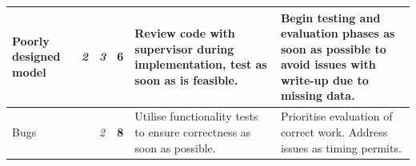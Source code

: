 \documentclass[12pt,a4,xcolor=table]{article}
\begin{document}
\begin{table}[h!]
\begin{tabular}{|>{\centering}m{1.5in} |>{\centering}m{0.1in} |>{\centering}m{0.1in} |>{\centering}m{0.3in} |>{\centering}m{1.8in} |>{\centering\arraybackslash}m{1.8in}|}
			Poorly designed model                                          & \cellcolor[HTML]{F8FF00}\textit{2}                        & \cellcolor[HTML]{FFC702}\textit{3}                        & \cellcolor[HTML]{FFC702}\textbf{6}  & Review code with supervisor during implementation, test as soon as is feasible.                                      & Begin testing and evaluation phases as soon as possible to avoid issues with write-up due to missing data.    \\ \hline
			Bugs                                                           & \cellcolor[HTML]{F88602}{\color[HTML]{333333} \textit{4}} & \cellcolor[HTML]{F8FF00}\textit{2}                        & \cellcolor[HTML]{FFC702}\textbf{8}  & Utilise functionality tests to ensure correctness as soon as possible.                                               & Prioritise evaluation of correct work. Address issues as timing permits.                                      \\ \hline	
		\end{tabular}
	\end{table}
	
\end{document}
